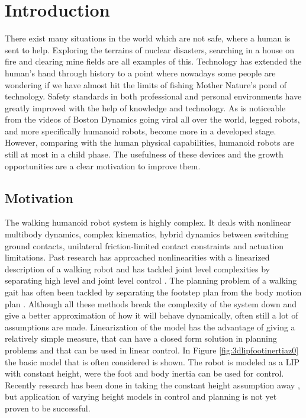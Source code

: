 %
\chapter{Introduction} \label{chap::intro}%
There exist many situations in the world which are not safe, where a human is sent to help. Exploring the terrains of nuclear disasters, searching in a house on fire and clearing mine fields are all examples of this. Technology has extended the human's hand through history to a point where nowadays some people are wondering if we have almost hit the limits of fishing Mother Nature's pond of technology.  Safety standards in both professional and personal environments have greatly improved with the help of knowledge and technology. As is noticeable from the videos of Boston Dynamics going viral all over the world, legged robots, and more specifically humanoid robots, become more in a developed stage. However, comparing with the human physical capabilities, humanoid robots are still at most in a child phase.  The usefulness of these devices and the growth opportunities are a clear motivation to improve them.
\section{Motivation}
The walking humanoid robot system is highly complex. It deals with nonlinear multibody dynamics, complex kinematics, hybrid dynamics between switching ground contacts, unilateral friction-limited contact constraints and actuation limitations. Past research has approached nonlinearities with a linearized description of a walking robot \cite{kajita1992dynamic, pratt2006capture, koolen2012capturability} and has tackled joint level complexities by separating high level and joint level control \cite{kuindersma2016optimization, koolen2016design}. The planning problem of a walking gait has often been tackled by separating the footstep plan from the body motion plan \cite{chestnutt2005footstep,deits2014footstep,englsberger2014trajectory}. Although all these methods break the complexity of the system down and give a better approximation of how it will behave dynamically, often still a lot of assumptions are made. Linearization of the model has the advantage of giving a relatively simple measure, that can have a closed form solution in planning problems and that can be used in linear control. In Figure \ref{fig:3dlipfootinertiaz0} the basic model that is often considered is shown. The robot is modeled as a \ac{LIP} with constant height, were the foot and body inertia can be used for control. Recently research has been done in taking the constant height assumption away \cite{hopkins2014humanoid,liu2015trajectory, koolen2016balance, gao2017increase,nguyen2017dynamic, caron2018capturability}, but application of varying height models in control and planning is not yet proven to be successful. 
